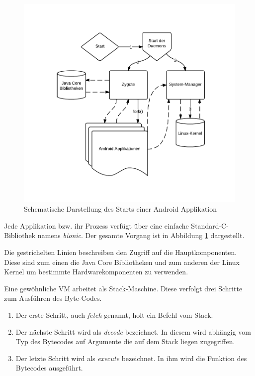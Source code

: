  \begin{figure}[h!t]
 \begin{center}
 \includegraphics[scale=0.5]{images/dvm}
 \caption{Schematische Darstellung des Starts einer Android Applikation}
 \label{dvm}
 \end{center}
 \end{figure}
 
 Jede Applikation bzw. ihr Prozess verfügt über eine einfache Standard-C-Bibliothek namens \textit{bionic}. Der gesamte Vorgang ist in Abbildung \ref{dvm} dargestellt.
 
 Die gestrichelten Linien beschreiben den Zugriff auf die Hauptkomponenten. Diese sind zum einen die Java Core Bibliotheken und zum anderen der Linux Kernel um bestimmte Hardwarekomponenten zu verwenden.
 
 Eine gewöhnliche VM arbeitet als Stack-Maschine. Diese verfolgt drei Schritte zum Ausführen des Byte-Codes.

 \begin{enumerate}
    \item Der erste Schritt, auch \textit{fetch} genannt, holt ein Befehl vom Stack.
    \item Der nächste Schritt wird als \textit{decode} bezeichnet. In diesem wird abhängig vom Typ des Bytecodes auf Argumente die auf dem Stack liegen zugegriffen.
    \item Der letzte Schritt wird als \textit{execute} bezeichnet. In ihm wird die Funktion des Bytecodes ausgeführt.
 \end{enumerate}
 
